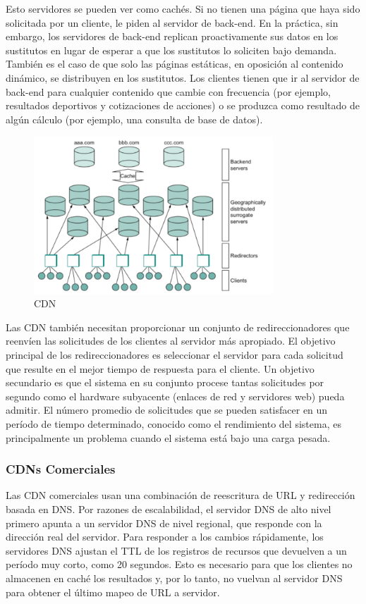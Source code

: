 Esto servidores se pueden ver como cachés. Si no tienen una página que haya sido solicitada por un cliente, le piden al servidor de back-end. En la práctica, sin embargo, los servidores de back-end replican proactivamente sus datos en los sustitutos en lugar de esperar a que los sustitutos lo soliciten bajo demanda. También es el caso de que solo las páginas estáticas, en oposición al contenido dinámico, se distribuyen en los sustitutos. Los clientes tienen que ir al servidor de back-end para cualquier contenido que cambie con frecuencia (por ejemplo, resultados deportivos y cotizaciones de acciones) o se produzca como resultado de algún cálculo (por ejemplo, una consulta de base de datos).

\begin{figure}[H]
	\centering
	\includegraphics[width=0.8\textwidth
]{images/cdn-distribution.png}
	\caption[CDN]{CDN}
	\label{fig:cdn-distribution}
\end{figure}
Las CDN también necesitan proporcionar un conjunto de redireccionadores que reenvíen las solicitudes de los clientes al servidor más apropiado. El objetivo principal de los redireccionadores es seleccionar el servidor para cada solicitud que resulte en el mejor tiempo de respuesta para el cliente. Un objetivo secundario es que el sistema en su conjunto procese tantas solicitudes por segundo como el hardware subyacente (enlaces de red y servidores web) pueda admitir. El número promedio de solicitudes que se pueden satisfacer en un período de tiempo determinado, conocido como el rendimiento del sistema, es principalmente un problema cuando el sistema está bajo una carga pesada.

\subsubsection{CDNs Comerciales}
Las CDN comerciales usan una combinación de reescritura de URL y redirección basada en DNS. Por razones de escalabilidad, el servidor DNS de alto nivel primero apunta a un servidor DNS de nivel regional, que responde con la dirección real del servidor. Para responder a los cambios rápidamente, los servidores DNS ajustan el TTL de los registros de recursos que devuelven a un período muy corto, como 20 segundos. Esto es necesario para que los clientes no almacenen en caché los resultados y, por lo tanto, no vuelvan al servidor DNS para obtener el último mapeo de URL a servidor.
